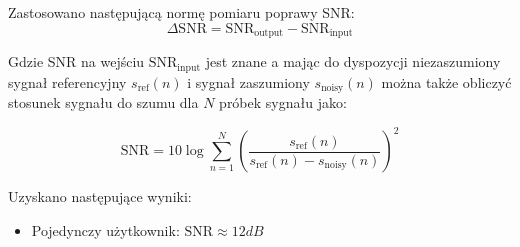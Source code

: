 \noindent Zastosowano następującą normę pomiaru poprawy SNR:
\begin{equation}
    \label{delta_SNR}
    \Delta \mathrm{SNR} = \mathrm{SNR}_{\mathrm{output}} - \mathrm{SNR}_{\mathrm{input}}
\end{equation}

\noindent Gdzie SNR na wejściu $\mathrm{SNR}_{\mathrm{input}}$ jest znane a mając do dyspozycji niezaszumiony sygnał referencyjny $s_{\mathrm{ref}}(n)$ i sygnał zaszumiony $s_{\mathrm{noisy}}(n)$ można także obliczyć stosunek sygnału do szumu dla $N$ próbek sygnału jako:

\begin{equation}
    \label{SNR}
    \mathrm{SNR} = 10 \log \sum_{n=1}^{N}\left(
    \dfrac
    {s_{\mathrm{ref}}(n)}
    {s_{\mathrm{ref}}(n)-s_{\mathrm{noisy}}(n)} \right)^{2}
\end{equation}

\noindent Uzyskano następujące wyniki:
\begin{itemize}
    \item Pojedynczy użytkownik: $\mathrm{SNR} \approx 12dB$ 
\end{itemize}








